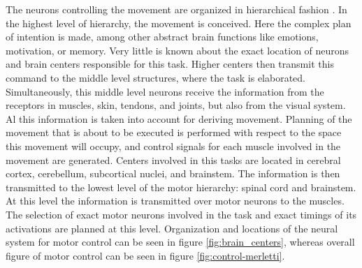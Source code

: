 The neurons controlling the movement are organized in hierarchical fashion \citep{Widmaier2014}. In the highest level of hierarchy, the movement is conceived. Here the complex plan of intention is made, among other abstract brain functions like emotions, motivation, or memory. Very little is known about the exact location of neurons and brain centers responsible for this task. Higher centers then transmit this command to the middle level structures, where the task is elaborated. Simultaneously, this middle level neurons receive the information from the receptors in muscles, skin, tendons, and joints, but also from the visual system. Al this information is taken into account for deriving movement. Planning of the movement that is about to be executed is performed with respect to the space this movement will occupy, and control signals for each muscle involved in the movement are generated. Centers involved in this tasks are located in cerebral cortex, cerebellum, subcortical nuclei, and brainstem. The information is then transmitted to the lowest level of the motor hierarchy: spinal cord and brainstem. At this level the information is transmitted over motor neurons to the muscles. The selection of exact motor neurons involved in the task and exact timings of its activations are planned at this level. Organization and locations of the neural system for motor control can be seen in figure \ref{fig:brain_centers}, whereas overall figure of motor control can be seen in figure \ref{fig:control-merletti}.
